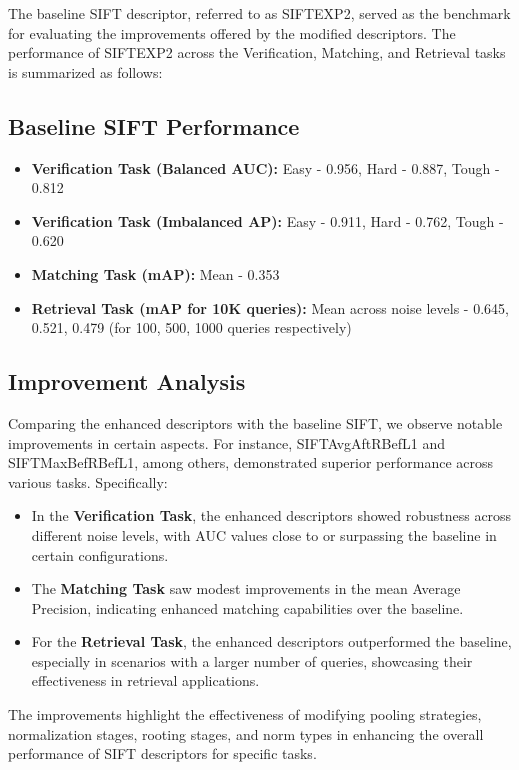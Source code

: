 The baseline SIFT descriptor, referred to as SIFTEXP2, served as the benchmark for evaluating the improvements offered by the modified descriptors. The performance of SIFTEXP2 across the Verification, Matching, and Retrieval tasks is summarized as follows:

\subsection*{Baseline SIFT Performance}

\begin{itemize}
    \item \textbf{Verification Task (Balanced AUC):} Easy - 0.956, Hard - 0.887, Tough - 0.812
    \item \textbf{Verification Task (Imbalanced AP):} Easy - 0.911, Hard - 0.762, Tough - 0.620
    \item \textbf{Matching Task (mAP):} Mean - 0.353
    \item \textbf{Retrieval Task (mAP for 10K queries):} Mean across noise levels - 0.645, 0.521, 0.479 (for 100, 500, 1000 queries respectively)
\end{itemize}

\subsection*{Improvement Analysis}

Comparing the enhanced descriptors with the baseline SIFT, we observe notable improvements in certain aspects. For instance, SIFTAvgAftRBefL1 and SIFTMaxBefRBefL1, among others, demonstrated superior performance across various tasks. Specifically:

\begin{itemize}
    \item In the \textbf{Verification Task}, the enhanced descriptors showed robustness across different noise levels, with AUC values close to or surpassing the baseline in certain configurations.
    \item The \textbf{Matching Task} saw modest improvements in the mean Average Precision, indicating enhanced matching capabilities over the baseline.
    \item For the \textbf{Retrieval Task}, the enhanced descriptors outperformed the baseline, especially in scenarios with a larger number of queries, showcasing their effectiveness in retrieval applications.
\end{itemize}

The improvements highlight the effectiveness of modifying pooling strategies, normalization stages, rooting stages, and norm types in enhancing the overall performance of SIFT descriptors for specific tasks.

